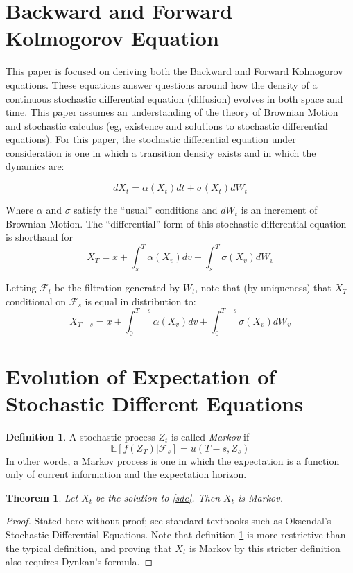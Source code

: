 \documentclass{article}
\newtheorem{theorem}{Theorem}
\theoremstyle{definition}
\newtheorem{definition}{Definition}
\begin{document}
\section{Backward and Forward Kolmogorov Equation}

This paper is focused on deriving both the Backward and Forward Kolmogorov equations.  These equations answer questions around how the density of a continuous stochastic differential equation (diffusion) evolves in both space and time.  This paper assumes an understanding of the theory of Brownian Motion and stochastic calculus (eg, existence and solutions to stochastic differential equations). For this paper, the stochastic differential equation under consideration is one in which a transition density exists and in which the dynamics are:

\begin{equation} \label{sde}
dX_t=\alpha(X_t) dt+\sigma(X_t) dW_t
\end{equation}

Where \(\alpha\) and \(\sigma\) satisfy the ``usual'' conditions and \(dW_t\) is an increment of Brownian Motion.  The ``differential'' form of this stochastic differential equation is shorthand for
\[X_T=x+\int_s^T \alpha(X_v) dv+\int_s^T\sigma(X_v) dW_v \]

Letting \(\mathcal{F}_t\) be the filtration generated by \(W_t\), note that (by uniqueness) that \(X_T\) conditional on \(\mathcal{F}_s\) is equal in distribution to:
\[X_{T-s}=x+\int_0^{T-s} \alpha(X_v) dv+\int_0^{T-s}\sigma(X_v) dW_v \]



\section{Evolution of Expectation of Stochastic Different Equations}

\begin{definition} \label{markov}
	A stochastic process \(Z_t\) is called \emph{Markov} if 
	\[\mathbb{E}[f(Z_T)|\mathcal{F}_s]=u(T-s, Z_s)\]
	In other words, a Markov process is one in which the expectation is a function only of current information and the expectation horizon.
\end{definition}

\begin{theorem}
	Let \(X_t\) be the solution to \ref{sde}.  Then \(X_t\) is Markov.  
\end{theorem}

\begin{proof}
	Stated here without proof; see standard textbooks such as Oksendal's Stochastic Differential Equations.  Note that definition \ref{markov} is more restrictive than the typical definition, and proving that \(X_t\) is Markov by this stricter definition also requires Dynkan's formula.
\end{proof}
\end{document}
